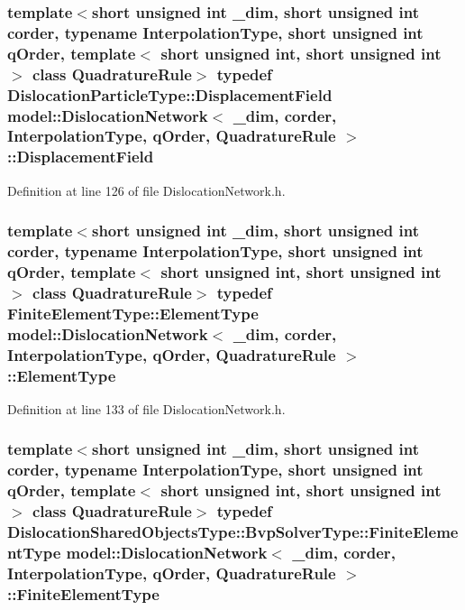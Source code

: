 \subsubsection[{Displacement\+Field}]{\setlength{\rightskip}{0pt plus 5cm}template$<$short unsigned int \+\_\+dim, short unsigned int corder, typename Interpolation\+Type, short unsigned int q\+Order, template$<$ short unsigned int, short unsigned int $>$ class Quadrature\+Rule$>$ typedef {\bf Dislocation\+Particle\+Type\+::\+Displacement\+Field} {\bf model\+::\+Dislocation\+Network}$<$ \+\_\+dim, corder, Interpolation\+Type, q\+Order, Quadrature\+Rule $>$\+::{\bf Displacement\+Field}}\label{classmodel_1_1_dislocation_network_aebd83877fb6e1d64a23878d7ec862a59}


Definition at line 126 of file Dislocation\+Network.\+h.

\hypertarget{classmodel_1_1_dislocation_network_a94c2f9be4e96e8c14abab8f94cd8c1b1}{}
\subsubsection[{Element\+Type}]{\setlength{\rightskip}{0pt plus 5cm}template$<$short unsigned int \+\_\+dim, short unsigned int corder, typename Interpolation\+Type, short unsigned int q\+Order, template$<$ short unsigned int, short unsigned int $>$ class Quadrature\+Rule$>$ typedef Finite\+Element\+Type\+::\+Element\+Type {\bf model\+::\+Dislocation\+Network}$<$ \+\_\+dim, corder, Interpolation\+Type, q\+Order, Quadrature\+Rule $>$\+::{\bf Element\+Type}}\label{classmodel_1_1_dislocation_network_a94c2f9be4e96e8c14abab8f94cd8c1b1}


Definition at line 133 of file Dislocation\+Network.\+h.

\hypertarget{classmodel_1_1_dislocation_network_a922220494d5bbb33852534a304b477f1}{}
\subsubsection[{Finite\+Element\+Type}]{\setlength{\rightskip}{0pt plus 5cm}template$<$short unsigned int \+\_\+dim, short unsigned int corder, typename Interpolation\+Type, short unsigned int q\+Order, template$<$ short unsigned int, short unsigned int $>$ class Quadrature\+Rule$>$ typedef Dislocation\+Shared\+Objects\+Type\+::\+Bvp\+Solver\+Type\+::\+Finite\+Element\+Type {\bf model\+::\+Dislocation\+Network}$<$ \+\_\+dim, corder, Interpolation\+Type, q\+Order, Quadrature\+Rule $>$\+::{\bf Finite\+Element\+Type}}\label{classmodel_1_1_dislocation_network_a922220494d5bbb33852534a304b477f1}


